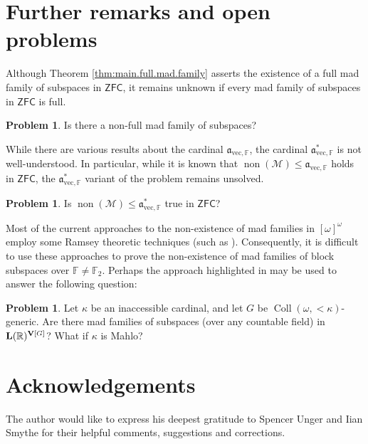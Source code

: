 \documentclass[11pt,reqno]{amsart}
\theoremstyle{plain}
\numberwithin{equation}{section}
\theoremstyle{definition}
\newtheorem{prob}[theorem]{Problem}
\newcommand{\func}{\operatorname}
\newcommand{\R}{\mathbb{R}}
\renewcommand{\frak}{\mathfrak}
\renewcommand{\bf}{\mathbf}
\newcommand{\ZFC}{\mathsf{ZFC}}
\newcommand{\non}{\func{non}}
\newcommand{\Coll}{\func{Coll}}
\newcommand{\M}{\mathcal{M}}
\newcommand{\V}{\bf{V}}
\newcommand{\avec}{\frak{a}_{\mathrm{vec},\mathbb{F}}}
\let\strokeL\L
\DeclareRobustCommand{\L}{\ifmmode\mathbf{L}\else\strokeL\fi}
\begin{document}
\section{Further remarks and open problems}
\label{sec:conclusion}
Although Theorem \ref{thm:main.full.mad.family} asserts the existence of a full mad family of subspaces in $\ZFC$, it remains unknown if every mad family of subspaces in $\ZFC$ is full.

\begin{prob}
    Is there a non-full mad family of subspaces?
\end{prob}

While there are various results about the cardinal $\avec$, the cardinal $\avec^*$ is not well-understood. In particular, while it is known that $\non(\M) \leq \avec$ holds in $\ZFC$, the $\avec^*$ variant of the problem remains unsolved.

\begin{prob}
    Is $\non(\M) \leq \avec^*$ true in $\ZFC$?
\end{prob}

Most of the current approaches to the non-existence of mad families in $[\omega]^\omega$ employ some Ramsey theoretic techniques (such as \cite{M77} \cite{NN18} \cite{ST19}). Consequently, it is difficult to use these approaches to prove the non-existence of mad families of block subspaces over $\mathbb{F} \neq \mathbb{F}_2$. Perhaps the approach highlighted in \cite{T18} may be used to answer the following question:

\begin{prob}
    Let $\kappa$ be an inaccessible cardinal, and let $G$ be $\Coll(\omega,<\!\kappa)$-generic. Are there mad families of subspaces (over any countable field) in $\L(\R)^{\V[G]}$? What if $\kappa$ is Mahlo?
\end{prob}

\section*{Acknowledgements}
The author would like to express his deepest gratitude to Spencer Unger and Iian Smythe for their helpful comments, suggestions and corrections.

\printbibliography[heading=bibintoc,title={References}]
\end{document}
